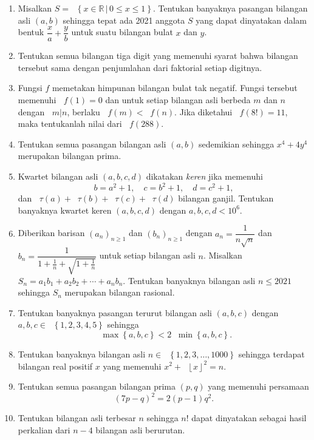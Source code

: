 \documentclass[12pt]{article}
\newcommand*\lrbr[1]{\mathop{}\!\left\lbrace#1\right\rbrace}
\newcommand*\floor[1]{\mathop{}\!\left\lfloor{#1}\right\rfloor}
\newcommand*\func[2]{\mathop{}\!{#1}{\left({#2}\right)}}
\newcommand*\funl[2]{\mathop{}\!{#1}{\left\lbrace{#2}\right\rbrace}}
\newcommand*\set[2]{\mathop{}\!\left\lbrace{{#1} \, \left| \, {#2} \right.}\right\rbrace}
\newcommand*\divid[2]{\mathop{}\!{#1} \left| {#2} \right.}
\begin{document}
\begin{enumerate}[leftmargin=*]
		\item Misalkan $ S = \set{x \in \mathbb{R}}{0 \leq x \leq 1} $. Tentukan banyaknya pasangan bilangan asli $ \left(a, b\right) $ sehingga tepat ada 2021 anggota $ S $ yang dapat dinyatakan dalam bentuk $ \dfrac{x}{a} + \dfrac{y}{b} $ untuk suatu bilangan bulat $ x $ dan $ y $.
		\item Tentukan semua bilangan tiga digit yang memenuhi syarat bahwa bilangan tersebut sama dengan penjumlahan dari faktorial setiap digitnya.
		\item Fungsi $ f $ memetakan himpunan bilangan bulat tak negatif. Fungsi tersebut memenuhi $ \func{f}{1} = 0 $ dan untuk setiap bilangan asli berbeda $ m $ dan $ n $ dengan $ \divid{m}{n} $, berlaku $ \func{f}{m} < \func{f}{n} $. Jika diketahui $ \func{f}{8!} = 11 $, maka tentukanlah nilai dari $ \func{f}{288} $.
		\item Tentukan semua pasangan bilangan asli $ \left(a, b\right) $ sedemikian sehingga $ x^{4} + 4y^{4} $ merupakan bilangan prima.
		\item Kwartet bilangan asli $ \left(a, b, c, d\right) $ dikatakan \textit{keren} jika memenuhi
		\[ b = a^{2} + 1, \quad c = b^{2} + 1, \quad d = c^{2} + 1, \]
		dan $ \func{\tau}{a} + \func{\tau}{b} + \func{\tau}{c} + \func{\tau}{d} $ bilangan ganjil. Tentukan banyaknya kwartet keren $ \left(a, b, c, d\right) $ dengan $ a, b, c, d < 10^{6} $.
		\item Diberikan barisan $ \left(a_{n}\right)_{n \geq 1} $ dan $ \left(b_{n}\right)_{n \geq 1} $ dengan $ a_{n} = \dfrac{1}{n\sqrt{n}} $ dan $ b_{n} = \dfrac{1}{1 + \frac{1}{n} + \sqrt{1 + \frac{1}{n}}} $ untuk setiap bilangan asli $ n $. Misalkan $ S_{n} = a_{1}b_{1} + a_{2}b_{2} + \cdots + a_{n}b_{n} $. Tentukan banyaknya bilangan asli $ n \leq 2021 $ sehingga $ S_{n} $ merupakan bilangan rasional.
		\item Tentukan banyaknya pasangan terurut bilangan asli $ \left(a, b, c\right) $ dengan $ a, b, c \in \lrbr{1, 2, 3, 4, 5} $ sehingga
		\[ \funl{\max}{a, b, c} < 2\funl{\min}{a, b, c}. \]
		\item Tentukan banyaknya bilangan asli $ n \in \lrbr{1, 2, 3, \dots, 1000} $ sehingga terdapat bilangan real positif $ x $ yang memenuhi $ x^{2} + \floor{x}^{2} = n $.
		\item Tentukan semua pasangan bilangan prima $ \left(p, q\right) $ yang memenuhi persamaan
		\[ \left(7p - q\right)^{2} = 2\left(p - 1\right)q^{2}. \]
		\item Tentukan bilangan asli terbesar $ n $ sehingga $ n! $ dapat dinyatakan sebagai hasil perkalian dari $ n - 4 $ bilangan asli berurutan.

\end{enumerate}
\end{document}
